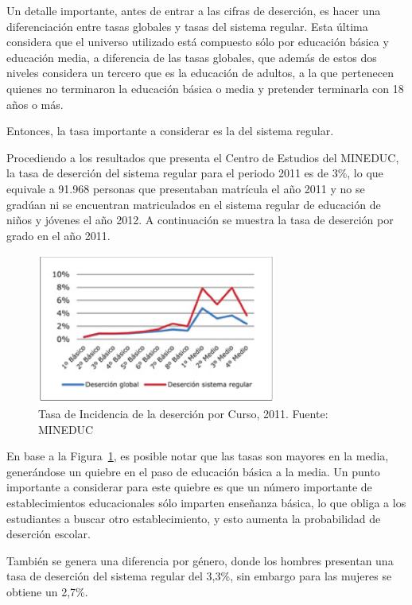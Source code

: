 Un detalle importante, antes de entrar a las cifras de deserción, es hacer una diferenciación entre tasas globales y tasas del sistema regular. Esta última considera que el universo utilizado está compuesto sólo por educación básica y educación media, a diferencia de las tasas globales, que además de estos dos niveles considera un tercero que es la educación de adultos, a la que pertenecen quienes no terminaron la educación básica o media y pretender terminarla con 18 años o más. 

Entonces, la tasa importante a considerar es la del sistema regular. 

Procediendo a los resultados que presenta el Centro de Estudios del MINEDUC, la tasa de deserción del sistema regular para el periodo 2011 es de 3\%, lo que equivale a 91.968 personas que presentaban matrícula el año 2011 y no se gradúan ni se encuentran matriculados en el sistema regular de educación de niños y jóvenes el año 2012. A continuación se muestra la tasa de deserción por grado en el año 2011. 

\begin{figure}[H]
  \centering
    \includegraphics[width=0.7\textwidth]{Figuras/desercioncurso}
      \caption{Tasa de Incidencia de la deserción por Curso, 2011. Fuente: MINEDUC}
    \label{fig:curso}
\end{figure}

En base a la Figura~\ref{fig:curso}, es posible notar que las tasas son mayores en la media, generándose un quiebre en el paso de educación básica a la media. Un punto importante a considerar para este quiebre es que un número importante de establecimientos educacionales sólo imparten enseñanza básica, lo que obliga a los estudiantes a buscar otro establecimiento, y esto aumenta la probabilidad de deserción escolar. 

También se genera una diferencia por género, donde los hombres presentan una tasa de deserción del sistema regular del 3,3\%, sin embargo para las mujeres se obtiene un 2,7\%.


